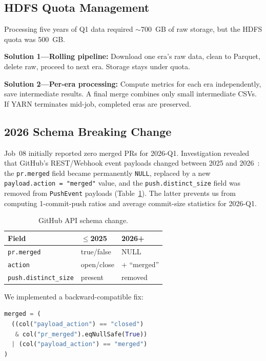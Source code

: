 \documentclass[11pt,twocolumn]{article}
\begin{document}
\subsection{HDFS Quota Management}

Processing five years of Q1 data required ${\sim}$700~GB of raw storage, but the HDFS quota was 500~GB.

\textbf{Solution 1---Rolling pipeline:} Download one era's raw data, clean to Parquet, delete raw, proceed to next era. Storage stays under quota.

\textbf{Solution 2---Per-era processing:} Compute metrics for each era independently, save intermediate results. A final merge combines only small intermediate CSVs. If YARN terminates mid-job, completed eras are preserved.

\subsection{2026 Schema Breaking Change}

Job~08 initially reported zero merged PRs for 2026-Q1.
Investigation revealed that GitHub's REST/Webhook event payloads changed between 2025 and 2026~\cite{ghchangelog2025}: the \texttt{pr.merged} field became permanently \texttt{NULL}, replaced by a new \texttt{payload.action\,=\,"merged"} value, and the \texttt{push.distinct\_size} field was removed from \texttt{PushEvent} payloads (Table~\ref{tab:schema-change}). The latter prevents us from computing 1-commit-push ratios and average commit-size statistics for 2026-Q1.

\begin{table}[t]
\centering\small
\caption{GitHub API schema change.}\label{tab:schema-change}
\begin{tabular}{@{}lll@{}}
\toprule
\textbf{Field} & \textbf{$\leq$2025} & \textbf{2026+} \\
\midrule
\texttt{pr.merged}  & true/false & NULL \\
\texttt{action}     & open/close & + ``merged'' \\
\texttt{push.distinct\_size} & present & removed \\
\bottomrule
\end{tabular}
\end{table}

We implemented a backward-compatible fix:
\begin{lstlisting}[language=Python]
merged = (
  ((col("payload_action") == "closed")
   & col("pr_merged").eqNullSafe(True))
  | (col("payload_action") == "merged")
)
\end{lstlisting}
\end{document}
